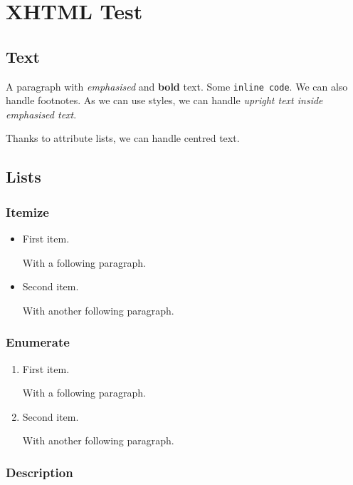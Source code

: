 \documentclass[
  text,
  xhtml,
  itex
]{internet}
\renewcommand\footnote[1]{}
\begin{document}
\section{XHTML Test}

\subsection{Text}

A paragraph with \emph{emphasised} and \textbf{bold} text.
Some \verb+inline code+.
We can also handle footnotes\footnote{with aplomb}.
As we can use styles, we can handle \emph{upright \textup{text} inside emphasised text}.
\begin{center}
Thanks to attribute lists, we can handle centred text.
\end{center}

\subsection{Lists}

\subsubsection{Itemize}

\begin{itemize}
\item First item.

With a following paragraph\footnote{that has a footnote}.

\item Second item.

With another following paragraph.
\end{itemize}

\subsubsection{Enumerate}

\begin{enumerate}
\item First item.

With a following paragraph.

\item Second item.

With another following paragraph.
\end{enumerate}

\subsubsection{Description}
\end{document}
